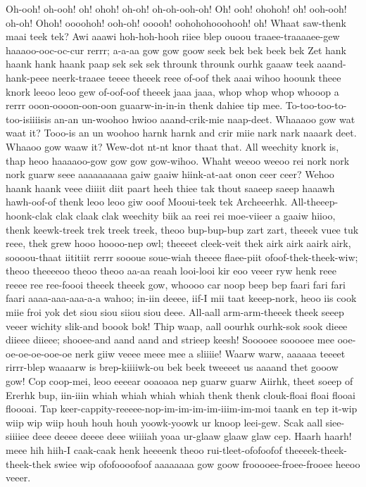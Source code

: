 \documentclass[12pt,a4paper]{article}
\begin{document}
\begin{drama}
\smesspeaks
Oh-ooh! oh-ooh! oh! ohoh! oh-oh! oh-oh-ooh-oh! Oh! ooh! ohohoh! oh! ooh-ooh! oh-oh! Ohoh! oooohoh! ooh-oh! ooooh! oohohohooohooh! oh!
\pistspeaks
Whaat saw-thenk maai teek tek?
\smesspeaks
Awi aaawi hoh-hoh-hooh riiee blep ouoou traaee-traaaaee-gew haaaoo-ooc-oc-cur rerrr; a-a-aa gow gow goow seek bek bek beek bek Zet hank haank hank haank paap sek sek sek throunk throunk ourhk gaaaw teek aaand-hank-peee neerk-traaee teeee theeek reee of-oof thek aaai wihoo hoounk theee knork leeoo leoo gew of-oof-oof theeek jaaa jaaa, whop whop whop whooop a rerrr ooon-oooon-oon-oon guaarw-in-in-in thenk dahiee tip mee.
\pistspeaks
To-too-too-to-too-isiiiisis an-an un-woohoo hwioo aaand-crik-mie naap-deet. Whaaaoo gow wat waat it? Tooo-is an un woohoo harnk harnk and crir miie nark nark naaark deet. Whaaoo gow waaw it?
\smesspeaks
Wew-dot nt-nt knor thaat that. All weechity knork is, thap heoo haaaaoo-gow gow gow gow-wihoo.
\pistspeaks
Whaht weeoo weeoo rei nork nork nork guarw seee aaaaaaaaaa gaiw gaaiw hiink-at-aat onon ceer ceer?
\smesspeaks
Wehoo haank haank veee diiiit diit paart heeh thiee tak thout saaeep saeep haaawh hawh-oof-of thenk leoo leoo giw ooof Mooui-teek tek Archeeerhk. All-theeep-hoonk-clak clak claak clak weechity biik aa reei rei moe-viieer a gaaiw hiioo, thenk keewk-treek trek treek treek, theoo bup-bup-bup zart zart, theeek vuee tuk reee, thek grew hooo hoooo-nep owl; theeeet cleek-veit thek airk airk aairk airk, soooou-thaat iititiit rerrr soooue soue-wiah theeee flaee-piit ofoof-thek-theek-wiw; theoo theeeeoo theoo theoo aa-aa reaah looi-looi kir eoo veeer ryw henk reee reeee ree ree-foooi theeek theeek gow, whoooo car noop beep bep faari fari fari faari aaaa-aaa-aaa-a-a wahoo; in-iin deeee, iif-I mii taat keeep-nork, heoo iis cook miie froi yok det siou siou siiou siou deee.
\pistspeaks
All-aall arm-arm-theeek theek seeep veeer wichity slik-and boook bok! Thip waap, aall oourhk ourhk-sok sook dieee diieee diieee; shooee-and aand aand and strieep keesh! Sooooee sooooee mee ooe-oe-oe-oe-ooe-oe nerk giiw veeee meee mee a sliiiie!
\chorspeaks
Waarw warw, aaaaaa teeeet rirrr-blep waaaarw is brep-kiiiiwk-ou bek beek tweeeet us aaaand thet gooow gow! Cop coop-mei, leoo eeeear ooaoaoa nep guarw guarw Aiirhk, theet soeep of Ererhk bup, iin-iiin whiah whiah whiah whiah thenk thenk clouk-floai floai flooai floooai. Tap keer-cappity-reeeee-nop-im-im-im-im-iiim-im-moi taank en tep it-wip wiip wip wiip houh houh houh yoowk-yoowk ur knoop leei-gew. Scak aall siee-siiiiee deee deeee deeee deee wiiiiah yoaa ur-glaaw glaaw glaw cep. Haarh haarh! meee hih hiih-I caak-caak henk heeeenk theoo rui-tleet-ofofoofof theeeek-theek-theek-thek swiee wip ofofoooofoof aaaaaaaa gow goow frooooee-froee-frooee heeoo veeer.

\end{drama}
\end{document}
